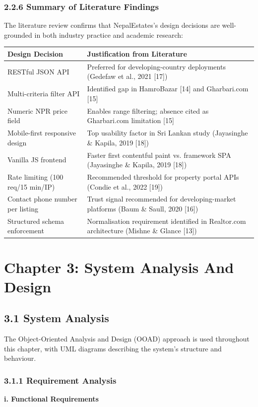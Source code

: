 \documentclass[12pt,a4paper]{report}
\begin{document}
\subsection{2.2.6 Summary of Literature Findings}
The literature review confirms that NepalEstates's design decisions are well-grounded in both industry practice and academic research:


\begin{center}
\begin{tabular}{|l|l|}
\hline
Design Decision & Justification from Literature \\
\hline
RESTful JSON API & Preferred for developing-country deployments (Gedefaw et al., 2021 [17]) \\
\hline
Multi-criteria filter API & Identified gap in HamroBazar [14] and Gharbari.com [15] \\
\hline
Numeric NPR price field & Enables range filtering; absence cited as Gharbari.com limitation [15] \\
\hline
Mobile-first responsive design & Top usability factor in Sri Lankan study (Jayasinghe \& Kapila, 2019 [18]) \\
\hline
Vanilla JS frontend & Faster first contentful paint vs. framework SPA (Jayasinghe \& Kapila, 2019 [18]) \\
\hline
Rate limiting (100 req/15 min/IP) & Recommended threshold for property portal APIs (Condie et al., 2022 [19]) \\
\hline
Contact phone number per listing & Trust signal recommended for developing-market platforms (Baum \& Saull, 2020 [16]) \\
\hline
Structured schema enforcement & Normalisation requirement identified in Realtor.com architecture (Mishne \& Glance [13]) \\
\hline
\end{tabular}
\end{center}

\chapter{Chapter 3: System Analysis And Design}
\section{3.1 System Analysis}
The Object-Oriented Analysis and Design (OOAD) approach is used throughout this chapter, with UML diagrams describing the system's structure and behaviour.

\subsection{3.1.1 Requirement Analysis}
\textbf{i. Functional Requirements}
\end{document}
